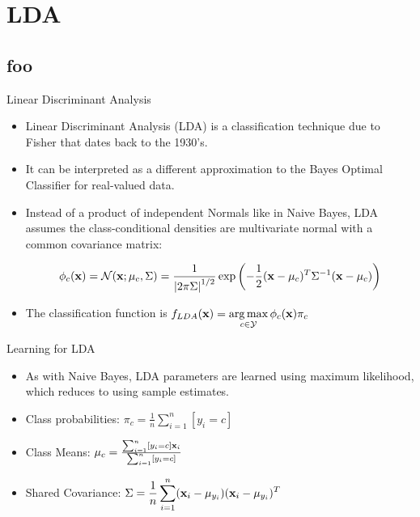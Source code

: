 \documentclass[serif,xcolor=pdftex,dvipsnames,table,hyperref={bookmarks=false}]{beamer}
\begin{document}
\section{LDA}
\subsection{foo}

\begin{frame}[t]{Linear Discriminant Analysis}

\begin{itemize}
\item Linear Discriminant Analysis (LDA) is a classification technique due to Fisher that dates back to the 1930's.

\pause\item It can be interpreted as a different approximation to the Bayes Optimal Classifier for real-valued data. 

\pause\item Instead of a product of independent Normals like in Naive Bayes, LDA assumes the class-conditional densities are multivariate normal with a common covariance matrix: 

$$\phi_c({\mathbf{x}}) = \mathcal{N}({\mathbf{x}};\mu_c,\Sigma) 
= \frac{1}{{|2\pi\Sigma|}^{1/2}}\exp\left(-\frac{1}{2}({\mathbf{x}}-\mu_c)^T\Sigma^{-1}({\mathbf{x}}-\mu_c)\right)$$

\pause \item The classification function is $\displaystyle f_{LDA}({\mathbf{x}}) = \operatorname*{arg\,max}_{c\in\mathcal{Y}} \phi_c({\mathbf{x}})\pi_c$

\end{itemize}

\end{frame}

\begin{frame}[t]{Learning for LDA}

\begin{itemize}
\item As with Naive Bayes, LDA parameters are learned using maximum likelihood, which reduces
to using sample estimates.

\pause \item Class probabilities: $\displaystyle \pi_c = \frac{1}{n}\sum_{i=1}^n [y_i=c]$

\pause \item Class Means: $\mu_{c} = \frac{\sum_{i=1}^n [y_i=c]{\mathbf{x}}_i}{\sum_{i=1}^n [y_i=c]}$

\pause \item Shared Covariance: $\displaystyle \Sigma = \frac{1}{n}\sum_{i=1}^n
({\mathbf{x}}_i-\mu_{y_i})({\mathbf{x}}_i-\mu_{y_i})^T$

\end{itemize}

\end{frame}
\end{document}
